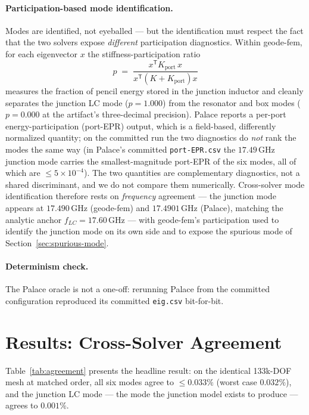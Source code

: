 \documentclass{anvil-paper}
\begin{document}
\paragraph{Participation-based mode identification.}
Modes are identified, not eyeballed --- but the identification must respect
the fact that the two solvers expose \emph{different} participation
diagnostics. Within geode-fem, for each eigenvector $x$ the
stiffness-participation ratio
\begin{equation}
  p \;=\; \frac{x^{\mathsf{T}} K_{\mathrm{port}}\, x}
               {x^{\mathsf{T}} \left(K + K_{\mathrm{port}}\right) x}
  \label{eq:participation}
\end{equation}
measures the fraction of pencil energy stored in the junction inductor and
cleanly separates the junction LC mode ($p = 1.000$) from the resonator and
box modes ($p = 0.000$ at the artifact's three-decimal precision). Palace
reports a per-port energy-participation (port-EPR) output, which is a
field-based, differently normalized quantity; on the committed run the two
diagnostics do \emph{not} rank the modes the same way (in Palace's
committed \texttt{port-EPR.csv} the $17.49$\,GHz junction mode carries the
smallest-magnitude port-EPR of the six modes, all of which are
$\leq 5\times10^{-4}$). The two quantities are complementary diagnostics,
not a shared discriminant, and we do not compare them numerically.
Cross-solver mode identification therefore rests on \emph{frequency}
agreement --- the junction mode appears at $17.490$\,GHz (geode-fem) and
$17.4901$\,GHz (Palace), matching the analytic anchor
$f_{LC} = 17.60$\,GHz --- with geode-fem's participation used to identify
the junction mode on its own side and to expose the spurious mode of
Section~\ref{sec:spurious-mode}.

\paragraph{Determinism check.}
The Palace oracle is not a one-off: rerunning Palace from the committed
configuration reproduced its committed \texttt{eig.csv} bit-for-bit.

\section{Results: Cross-Solver Agreement}
\label{sec:agreement}

Table~\ref{tab:agreement} presents the headline result: on the identical
133k-DOF mesh at matched order, all six modes agree to $\leq 0.033\%$
(worst case $0.032\%$), and the junction LC mode --- the mode the junction
model exists to produce --- agrees to $0.001\%$.
\end{document}
